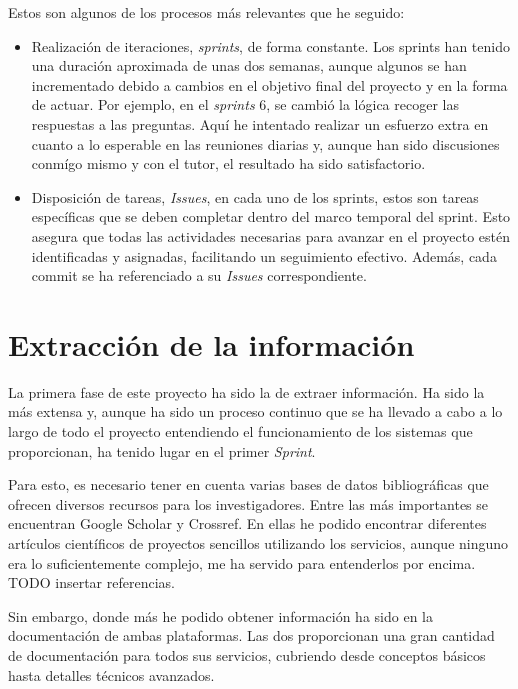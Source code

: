Estos son algunos de los procesos más relevantes que he seguido:

\begin{itemize}
\item Realización de iteraciones, \textit{sprints}, de forma constante. Los sprints han tenido una duración aproximada de unas dos semanas, aunque algunos se han incrementado debido a cambios en el objetivo final del proyecto y en la forma de actuar. Por ejemplo, en el \textit{sprints} 6, se cambió la lógica recoger las respuestas a las preguntas. Aquí he intentado realizar un esfuerzo extra en cuanto a lo esperable en las reuniones diarias y, aunque han sido discusiones conmígo mismo y con el tutor, el resultado ha sido satisfactorio. 
\item Disposición de tareas, \textit{Issues}, en cada uno de los sprints, estos son tareas específicas que se deben completar dentro del marco temporal del sprint. Esto asegura que todas las actividades necesarias para avanzar en el proyecto estén identificadas y asignadas, facilitando un seguimiento efectivo. Además, cada commit se ha referenciado a su \textit{Issues} correspondiente. 
    
\end{itemize}

\section{Extracción de la información}\label{Metodologías}

La primera fase de este proyecto ha sido la de extraer información. Ha sido la más extensa y, aunque ha sido un proceso continuo que se ha llevado a cabo a lo largo de todo el proyecto entendiendo el funcionamiento de los sistemas que proporcionan, ha tenido lugar en el primer \textit{Sprint}.

Para esto, es necesario tener en cuenta varias bases de datos bibliográficas que ofrecen diversos recursos para los investigadores. Entre las más importantes se encuentran Google Scholar  y Crossref. En ellas he podido encontrar diferentes artículos científicos de proyectos sencillos utilizando los servicios, aunque ninguno era lo suficientemente complejo, me ha servido para entenderlos por encima. \\TODO insertar referencias.

Sin embargo, donde más he podido obtener información ha sido en la documentación de ambas plataformas. Las dos proporcionan una gran cantidad de documentación para todos sus servicios, cubriendo desde conceptos básicos hasta detalles técnicos avanzados.

